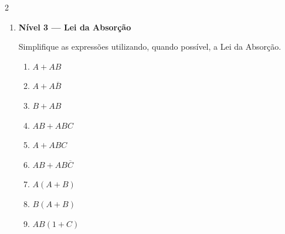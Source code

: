 \documentclass[a4paper,12pt]{article}
\begin{document}
\begin{multicols}{2}
\begin{enumerate}[leftmargin=*]
\begin{enumerate}[label=(\Alph*)]
    \item $AB + \overline{A}B$

    \item $AB + AC$

    \item $ABC + AB\overline{C}$

    \item $ABC + \overline{A}BC$

    \item $AB\overline{C} + ABC$

    \item $ABC + ABD$

    \item $\overline{A}B + \overline{A}\overline{B}$

    \item $A\overline{B} + AB$

    \item $ABC + ABC$

\end{enumerate}

\vspace{0.4cm}


\item \textbf{Nível 3 — Lei da Absorção}

Simplifique as expressões utilizando, quando possível, a Lei da Absorção.

\begin{enumerate}[label=(\Alph*)]

    \item $A + AB$

    \item $A + A\overline{B}$

    \item $B + AB$

    \item $AB + ABC$

    \item $A + ABC$

    \item $AB + AB\overline{C}$

    \item $A(A+B)$

    \item $B(A+B)$

    \item $AB(1+C)$


\end{enumerate}
\end{enumerate}
\end{multicols}
\end{document}
